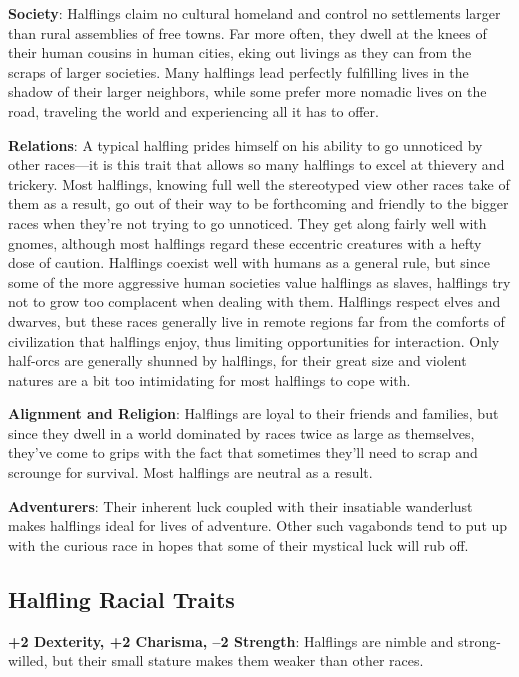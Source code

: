 \textbf{Society}: Halflings claim no cultural homeland and control no settlements larger than rural assemblies of free towns. Far more often, they dwell at the knees of their human cousins in human cities, eking out livings as they can from the scraps of larger societies. Many halflings lead perfectly fulfilling lives in the shadow of their larger neighbors, while some prefer more nomadic lives on the road, traveling the world and experiencing all it has to offer.
				
\textbf{Relations}: A typical halfling prides himself on his ability to go unnoticed by other races---it is this trait that allows so many halflings to excel at thievery and trickery. Most halflings, knowing full well the stereotyped view other races take of them as a result, go out of their way to be forthcoming and friendly to the bigger races when they're not trying to go unnoticed. They get along fairly well with gnomes, although most halflings regard these eccentric creatures with a hefty dose of caution. Halflings coexist well with humans as a general rule, but since some of the more aggressive human societies value halflings as slaves, halflings try not to grow too complacent when dealing with them. Halflings respect elves and dwarves, but these races generally live in remote regions far from the comforts of civilization that halflings enjoy, thus limiting opportunities for interaction. Only half-orcs are generally shunned by halflings, for their great size and violent natures are a bit too intimidating for most halflings to cope with. 
				
\textbf{Alignment and Religion}: Halflings are loyal to their friends and families, but since they dwell in a world dominated by races twice as large as themselves, they've come to grips with the fact that sometimes they'll need to scrap and scrounge for survival. Most halflings are neutral as a result.
				
\textbf{Adventurers}: Their inherent luck coupled with their insatiable wanderlust makes halflings ideal for lives of adventure. Other such vagabonds tend to put up with the curious race in hopes that some of their mystical luck will rub off.
											
\subsection{Halfling Racial Traits}

				
\textbf{+2 Dexterity, +2 Charisma, --2 Strength}: Halflings are nimble and strong-willed, but their small stature makes them weaker than other races.
				
